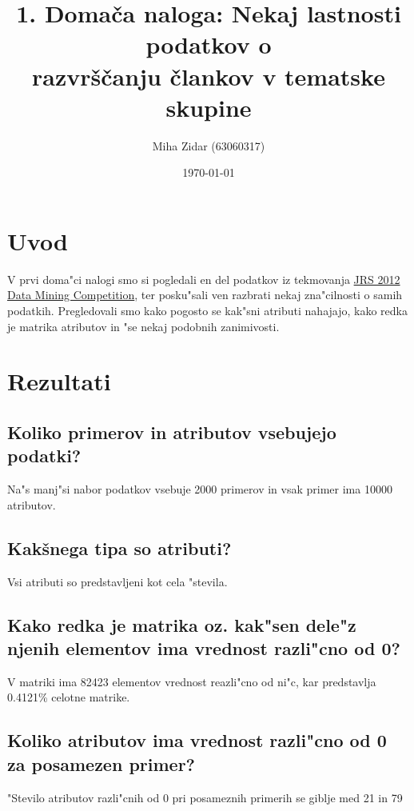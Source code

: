 \documentclass[a4paper,11pt]{article}
\title{1. Domača naloga: Nekaj lastnosti podatkov o\\ razvrščanju člankov v tematske skupine}
\author{Miha Zidar (63060317)}
\date{\today}
\begin{document}
\maketitle

\section{Uvod}

V prvi doma"ci nalogi smo si pogledali en del podatkov iz tekmovanja \href{http://tunedit.org/challenge/JRS12Contest}{JRS 2012 Data Mining Competition}, ter posku"sali ven razbrati nekaj zna"cilnosti o samih podatkih. Pregledovali smo kako pogosto se kak"sni atributi nahajajo, kako redka je matrika atributov in "se nekaj podobnih zanimivosti.

\section{Rezultati}

\subsection{Koliko primerov in atributov vsebujejo podatki?}

Na"s manj"si nabor podatkov vsebuje 2000 primerov in vsak primer ima 10000 atributov. 

\subsection{Kakšnega tipa so atributi?}

Vsi atributi so predstavljeni kot cela "stevila.

\subsection{Kako redka je matrika oz. kak"sen dele"z njenih elementov ima vrednost razli"cno od 0?}\label{delez1}

V matriki ima 82423 elementov vrednost reazli"cno od ni"c, kar predstavlja 0.4121\% celotne matrike.

\subsection{Koliko atributov ima vrednost razli"cno od 0 za posamezen primer?}

"Stevilo atributov razli"cnih od 0 pri posameznih primerih se giblje med 21 in 79
\end{document}

